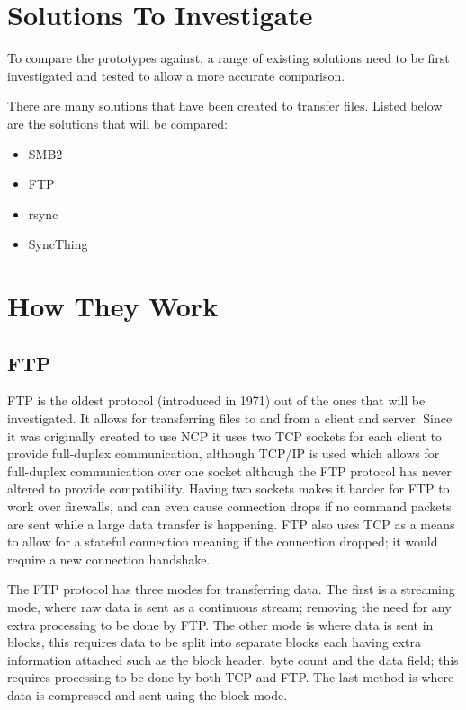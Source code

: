 \section{Solutions To Investigate}
To compare the prototypes against, a range of existing solutions need to be first investigated and tested to allow a more accurate comparison.

There are many solutions that have been created to transfer files. Listed below are the solutions that will be compared:

\begin{itemize}
	\item SMB2
    \item FTP
	\item rsync
	\item SyncThing
\end{itemize}


\section{How They Work}
\subsection*{FTP}
FTP is the oldest protocol (introduced in 1971) out of the ones that will be investigated. It allows for transferring files to and from a client and server. Since it was originally created to use NCP it uses two TCP sockets for each client to provide full-duplex communication, although TCP/IP is used which allows for full-duplex communication over one socket although the FTP protocol has never altered to provide compatibility. Having two sockets makes it harder for FTP to work over firewalls, and can even cause connection drops if no command packets are sent while a large data transfer is happening. FTP also uses TCP as a means to allow for a stateful connection meaning if the connection dropped; it would require a new connection handshake.

The FTP protocol has three modes for transferring data. The first is a streaming mode, where raw data is sent as a continuous stream; removing the need for any extra processing to be done by FTP. The other mode is where data is sent in blocks, this requires data to be split into separate blocks each having extra information attached such as the block header, byte count and the data field; this requires processing to be done by both TCP and FTP. The last method is where data is compressed and sent using the block mode.

